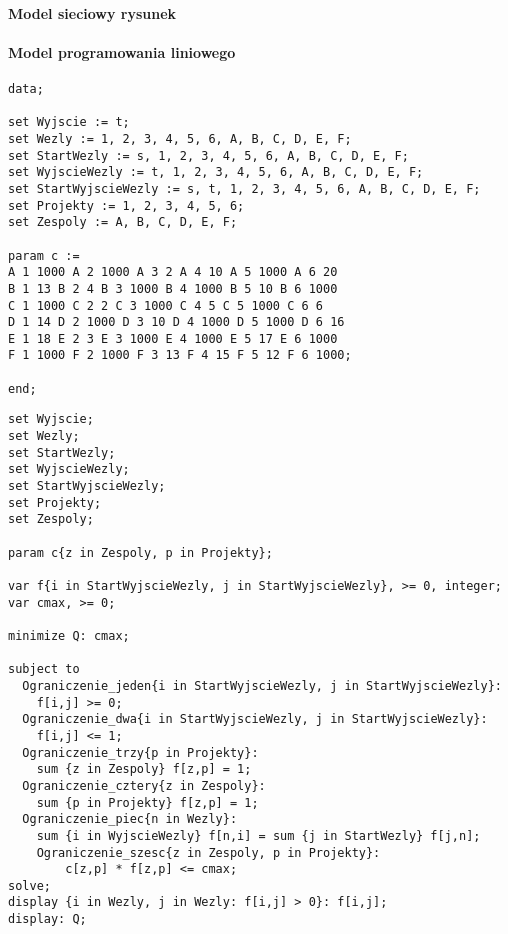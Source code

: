 \documentclass[12pt]{article}
\begin{document}
\paragraph{Model sieciowy rysunek}

\paragraph{Model programowania liniowego}
\begin{lstlisting}[caption= plik dat]
data; 
 
set Wyjscie := t; 
set Wezly := 1, 2, 3, 4, 5, 6, A, B, C, D, E, F; 
set StartWezly := s, 1, 2, 3, 4, 5, 6, A, B, C, D, E, F; 
set WyjscieWezly := t, 1, 2, 3, 4, 5, 6, A, B, C, D, E, F; 
set StartWyjscieWezly := s, t, 1, 2, 3, 4, 5, 6, A, B, C, D, E, F; 
set Projekty := 1, 2, 3, 4, 5, 6; 
set Zespoly := A, B, C, D, E, F; 
 
param c := 
A 1 1000 A 2 1000 A 3 2 A 4 10 A 5 1000 A 6 20
B 1 13 B 2 4 B 3 1000 B 4 1000 B 5 10 B 6 1000 
C 1 1000 C 2 2 C 3 1000 C 4 5 C 5 1000 C 6 6 
D 1 14 D 2 1000 D 3 10 D 4 1000 D 5 1000 D 6 16 
E 1 18 E 2 3 E 3 1000 E 4 1000 E 5 17 E 6 1000 
F 1 1000 F 2 1000 F 3 13 F 4 15 F 5 12 F 6 1000; 
 
end; 
\end{lstlisting}
\begin{lstlisting}[caption= plik mod]
set Wyjscie; 
set Wezly; 
set StartWezly; 
set WyjscieWezly; 
set StartWyjscieWezly; 
set Projekty; 
set Zespoly; 
 
param c{z in Zespoly, p in Projekty}; 
 
var f{i in StartWyjscieWezly, j in StartWyjscieWezly}, >= 0, integer; 
var cmax, >= 0; 
 
minimize Q: cmax; 
 
subject to
  Ograniczenie_jeden{i in StartWyjscieWezly, j in StartWyjscieWezly}: 
    f[i,j] >= 0; 
  Ograniczenie_dwa{i in StartWyjscieWezly, j in StartWyjscieWezly}: 
    f[i,j] <= 1; 
  Ograniczenie_trzy{p in Projekty}: 
    sum {z in Zespoly} f[z,p] = 1; 
  Ograniczenie_cztery{z in Zespoly}: 
    sum {p in Projekty} f[z,p] = 1; 
  Ograniczenie_piec{n in Wezly}: 
    sum {i in WyjscieWezly} f[n,i] = sum {j in StartWezly} f[j,n]; 
	Ograniczenie_szesc{z in Zespoly, p in Projekty}: 
		c[z,p] * f[z,p] <= cmax;
solve;
display {i in Wezly, j in Wezly: f[i,j] > 0}: f[i,j]; 
display: Q;
\end{lstlisting}
\end{document}
